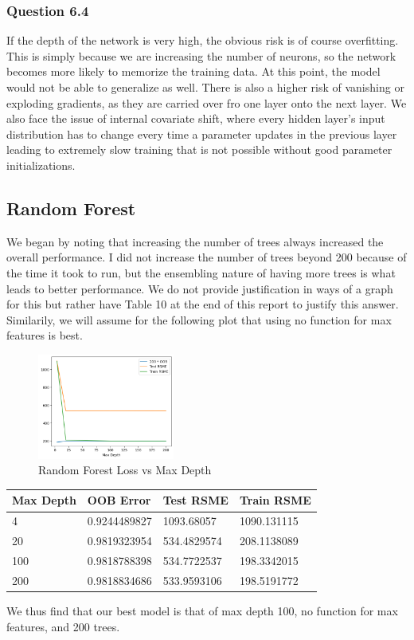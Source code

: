 \documentclass[11pt,letterpaper]{article}
\begin{document}
\subsubsection*{Question 6.4}
If the depth of the network is very high, the obvious risk is of course overfitting. This is simply because we are
increasing the number of neurons, so the network becomes more likely to memorize the training data. At this point,
the model would not be able to generalize as well. There is also a higher risk of vanishing or exploding gradients,
as they are carried over fro one layer onto the next layer. We also face the issue of internal covariate shift, 
where every hidden layer's input distribution has to change every time a parameter updates in the previous layer 
leading to extremely slow training that is not possible without good parameter initializations. 
\subsection*{Random Forest}
We began by noting that increasing the number of trees always increased the overall performance.
I did not increase the number of trees beyond 200 because of the time it took to run, but 
the ensembling nature of having more trees is what leads to better performance. We do not 
provide justification in ways of a graph for this but rather have Table 10 at the end of this 
report to justify this answer. Similarily, we will assume for the
following plot that using no function for max features is best.
\begin{figure}[H]
    \centering
        \includegraphics[width=0.4\textwidth]{../Figures/treePlot.png}
       \caption{Random Forest Loss vs Max Depth}
       \label{fig:boxPlots}
\end{figure}

\begin{table}[!ht]
    \centering
    \begin{tabular}{llll}
    \hline
        Max Depth & OOB Error & Test RSME & Train RSME \\ \hline
        4 & 0.9244489827 & 1093.68057 & 1090.131115 \\
        20 & 0.9819323954 & 534.4829574 & 208.1138089 \\
        100 & 0.9818788398 & 534.7722537 & 198.3342015 \\
        200 & 0.9818834686 & 533.9593106 & 198.5191772
    \end{tabular}
\end{table}
We thus find that our best model is that of max depth 100, no function for max features, and 
200 trees. 
\end{document}
